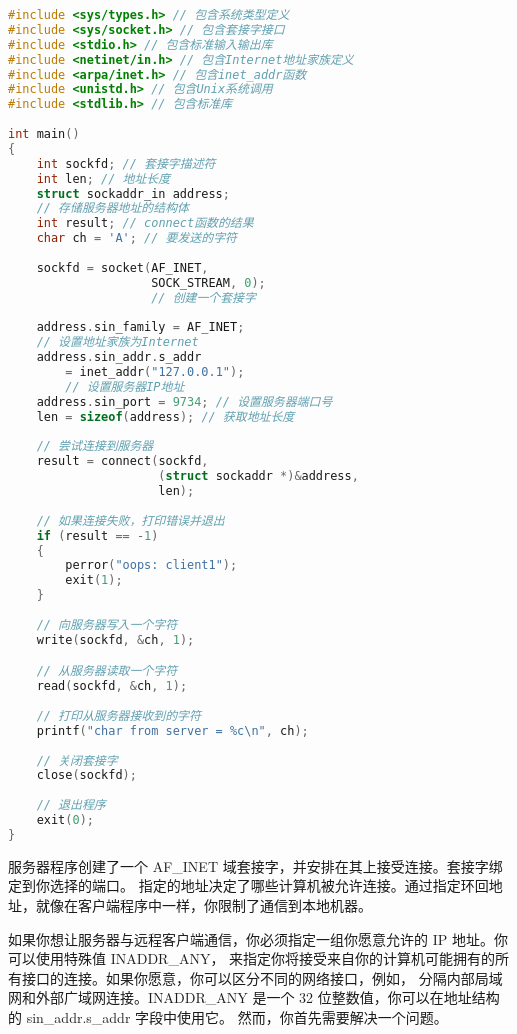 \documentclass{ctexart}
\begin{document}
\begin{lstlisting}[language=C]
#include <sys/types.h> // 包含系统类型定义  
#include <sys/socket.h> // 包含套接字接口  
#include <stdio.h> // 包含标准输入输出库  
#include <netinet/in.h> // 包含Internet地址家族定义  
#include <arpa/inet.h> // 包含inet_addr函数  
#include <unistd.h> // 包含Unix系统调用  
#include <stdlib.h> // 包含标准库  
  
int main()  
{  
    int sockfd; // 套接字描述符  
    int len; // 地址长度  
    struct sockaddr_in address; 
    // 存储服务器地址的结构体  
    int result; // connect函数的结果  
    char ch = 'A'; // 要发送的字符  
  
    sockfd = socket(AF_INET, 
                    SOCK_STREAM, 0); 
                    // 创建一个套接字  
  
    address.sin_family = AF_INET; 
    // 设置地址家族为Internet  
    address.sin_addr.s_addr 
        = inet_addr("127.0.0.1"); 
        // 设置服务器IP地址  
    address.sin_port = 9734; // 设置服务器端口号  
    len = sizeof(address); // 获取地址长度  
  
    // 尝试连接到服务器  
    result = connect(sockfd, 
                     (struct sockaddr *)&address, 
                     len);  
  
    // 如果连接失败，打印错误并退出  
    if (result == -1)  
    {  
        perror("oops: client1");  
        exit(1);  
    }  
  
    // 向服务器写入一个字符  
    write(sockfd, &ch, 1);

    // 从服务器读取一个字符  
    read(sockfd, &ch, 1);  
  
    // 打印从服务器接收到的字符  
    printf("char from server = %c\n", ch);  
  
    // 关闭套接字  
    close(sockfd);  
  
    // 退出程序  
    exit(0);  
}      
\end{lstlisting}

服务器程序创建了一个 AF\_INET 域套接字，并安排在其上接受连接。套接字绑定到你选择的端口。
指定的地址决定了哪些计算机被允许连接。通过指定环回地址，就像在客户端程序中一样，你限制了通信到本地机器。  
  
如果你想让服务器与远程客户端通信，你必须指定一组你愿意允许的 IP 地址。你可以使用特殊值 INADDR\_ANY，
来指定你将接受来自你的计算机可能拥有的所有接口的连接。如果你愿意，你可以区分不同的网络接口，例如，
分隔内部局域网和外部广域网连接。INADDR\_ANY 是一个 32 位整数值，你可以在地址结构的 sin\_addr.s\_addr 字段中使用它。
然而，你首先需要解决一个问题。
\end{document}
